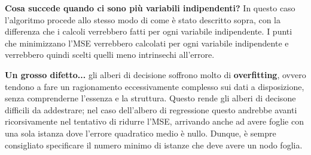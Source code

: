 \documentclass[a4paper, 11pt, oneside]{report}
\begin{document}
                \bigskip
                \par \noindent \textbf{Cosa succede quando ci sono più variabili indipendenti?} In questo caso l'algoritmo
                procede allo stesso modo di come è stato descritto sopra, con la differenza che i calcoli verrebbero fatti
                per ogni variabile indipendente. I punti che minimizzano l'MSE verrebbero calcolati per ogni variabile
                indipendente e verrebbero quindi scelti quelli meno intrinsechi all'errore.
                \\
                \par \noindent \textbf{Un grosso difetto...} gli alberi di decisione soffrono molto di \textbf{overfitting},
                ovvero tendono a fare un ragionamento eccessivamente complesso sui dati a disposizione, senza comprenderne
                l'essenza e la struttura. Questo rende gli alberi di decisone difficili da addestrare; nel caso dell'albero
                di regressione questo andrebbe avanti ricorsivamente nel tentativo di ridurre l'MSE, arrivando anche ad
                avere foglie con una sola istanza dove l'errore quadratico medio è nullo. Dunque, è sempre consigliato
                specificare il numero minimo di istanze che deve avere un nodo foglia.
                \\
                \newpage
\end{document}
